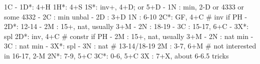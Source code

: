 1C - 
1D*: 4+H
1H*: 4+S
1S*: inv+, 4+D; or 5+D
   - 1N : min, 2-D or 4333 or some 4332
   - 2C : min unbal
   - 2D : 3+D
1N : 6-10
2C*: GF, 4+C  # inv if PH
   - 2D*: 12-14
   - 2M : 15+, nat, usually 3+M
   - 2N : 18-19
   - 3C : 15-17, 6+C
   - 3X*: spl
2D*: inv, 4+C  # constr if PH
   - 2M : 15+, nat, usually 3+M
   - 2N : nat min
   - 3C : nat min
   - 3X*: spl
   - 3N : nat  # 13-14/18-19
2M : 3-7, 6+M  # not interested in 16-17, 2-M
2N*: 7-9, 5+C
3C*: 0-6, 5+C
3X : 7+X, about 6-6.5 tricks
